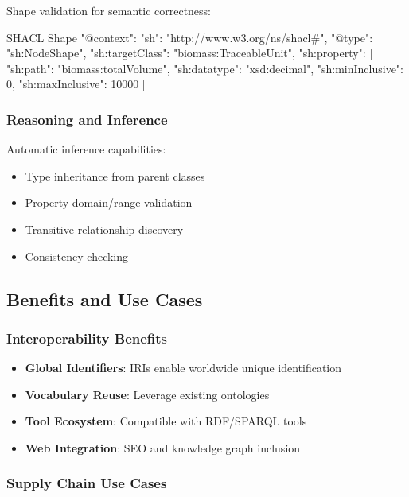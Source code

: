 Shape validation for semantic correctness:

\begin{jsonexample}{SHACL Shape}
{
  "@context": {"sh": "http://www.w3.org/ns/shacl#"},
  "@type": "sh:NodeShape",
  "sh:targetClass": "biomass:TraceableUnit",
  "sh:property": [{
    "sh:path": "biomass:totalVolume",
    "sh:datatype": "xsd:decimal",
    "sh:minInclusive": 0,
    "sh:maxInclusive": 10000
  }]
}
\end{jsonexample}

\subsubsection{Reasoning and Inference}

Automatic inference capabilities:

\begin{itemize}
    \item Type inheritance from parent classes
    \item Property domain/range validation
    \item Transitive relationship discovery
    \item Consistency checking
\end{itemize}

\subsection{Benefits and Use Cases}
\label{sec:jsonld-benefits}

\subsubsection{Interoperability Benefits}

\begin{itemize}
    \item \textbf{Global Identifiers}: IRIs enable worldwide unique identification
    \item \textbf{Vocabulary Reuse}: Leverage existing ontologies
    \item \textbf{Tool Ecosystem}: Compatible with RDF/SPARQL tools
    \item \textbf{Web Integration}: SEO and knowledge graph inclusion
\end{itemize}

\subsubsection{Supply Chain Use Cases}

